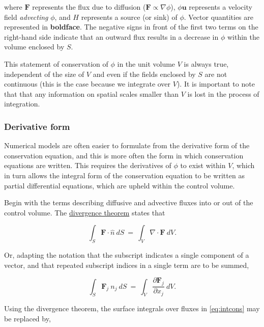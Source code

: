 where ${\mathbf F}$ represents the flux due to diffusion
($\mathbf{F} \propto \nabla \phi$), $\phi {\mathbf u}$ represents a velocity field 
\emph{advecting} $\phi$, and $H$ represents a source (or sink) of $\phi$. Vector quantities are
represented in \textbf{boldface}. The negative signs in front of the first two terms on the right-hand 
side indicate that an outward flux results in a decrease in $\phi$ within the volume enclosed by $S$.

This statement of conservation of $\phi$ in the unit volume $V$ is always true, independent of the 
size of $V$ and even if the fields enclosed by $S$ are not continuous (this is the case because we
integrate over $V$). It is important to note that that any information on spatial scales smaller than $V$ 
is lost in the process of integration.

\subsubsection{Derivative form}

Numerical models are often easier to formulate from the derivative form of the conservation equation, and this
is more often the form in which conservation equations are written. This requires the derivatives of $\phi$ to exist 
within $V$, which in turn allows the integral form of the conservation equation to be written as partial differential 
equations, which are upheld within the control volume.

Begin with the terms describing diffusive and advective fluxes into or out of the control volume. The
\href{http://en.wikipedia.org/wiki/Divergence_theorem}{divergence theorem} states that

\begin{equation}
{ \int }_{S} {\mathbf F} {\cdot} \hat{n} ~dS~ = ~{ \int }_{V} \nabla 
    {\cdot} {\mathbf F} ~dV. 
\end{equation}

Or, adapting the notation that the subscript indicates a single component of a vector, and that repeated subscript 
indices in a single term are to be summed,

\begin{equation}
{ \int }_{ S} {\mathbf F}_{ j} ~n_{ j} ~dS~ = ~{ \int }_{ V} {\frac{
    \partial {\mathbf F}_{ j} }{ \partial x_{ j} }} ~dV.
\end{equation}

Using the divergence theorem, the surface integrals over fluxes in \eqref{eq:intcons} may be replaced by,

